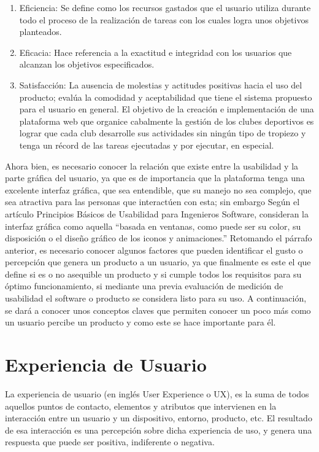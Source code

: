 \documentclass[11pt]{article}
\begin{document}
\begin{normalsize}
\begin{flushleft}
\begin{itemize}
        \end{itemize}
        \begin{itemize}
            \begin{enumerate}
                \item Eficiencia: Se define como los recursos gastados que el usuario utiliza durante todo el proceso de la realización de tareas con los cuales logra unos objetivos planteados. 
                \break
                \item Eficacia: Hace referencia a la exactitud e integridad con los usuarios que alcanzan los objetivos especificados. 
                \break
                \item Satisfacción: La ausencia de molestias y actitudes positivas hacia el uso del producto; evalúa la comodidad y aceptabilidad que tiene el sistema propuesto para el usuario en general. El objetivo de la creación e implementación de una plataforma web que organice cabalmente la gestión de los clubes deportivos es lograr que cada club desarrolle sus actividades sin ningún tipo de tropiezo y tenga un récord de las tareas ejecutadas y por ejecutar, en especial. 
            \end{enumerate}
        \end{itemize}
        \begin{itemize}
            Ahora bien, es necesario conocer la relación que existe entre la usabilidad y la parte gráfica del usuario, ya que es de importancia que la plataforma tenga una excelente interfaz gráfica, que sea entendible, que su manejo no sea complejo, que sea atractiva para las personas que interactúen con esta; sin embargo Según el artículo Principios Básicos de Usabilidad para Ingenieros Software, consideran la interfaz gráfica como aquella “basada en ventanas, como puede ser su color, su disposición o el diseño gráfico de los iconos y animaciones.” Retomando el párrafo anterior, es necesario conocer algunos factores que pueden identificar el gusto o percepción que genera un producto a un usuario, ya que finalmente es este el que define si es o no asequible un producto y si cumple todos los requisitos para su óptimo funcionamiento, si mediante una previa evaluación de medición de usabilidad el software o producto se considera listo para su uso. A continuación, se dará a conocer unos conceptos claves que permiten conocer un poco más como un usuario percibe un producto y como este se hace importante para él. 
        \end{itemize}
	\section{Experiencia de Usuario}
	    \begin{itemize}
	        La experiencia de usuario (en inglés User Experience o UX), es la suma de todos aquellos puntos de contacto, elementos y atributos que intervienen en la interacción entre un usuario y un dispositivo, entorno, producto, etc. El resultado de esa interacción es una percepción sobre dicha experiencia de uso, y genera una respuesta que puede ser positiva, indiferente o negativa.
	    \end{itemize}

\end{flushleft}
\end{normalsize}
\end{document}

